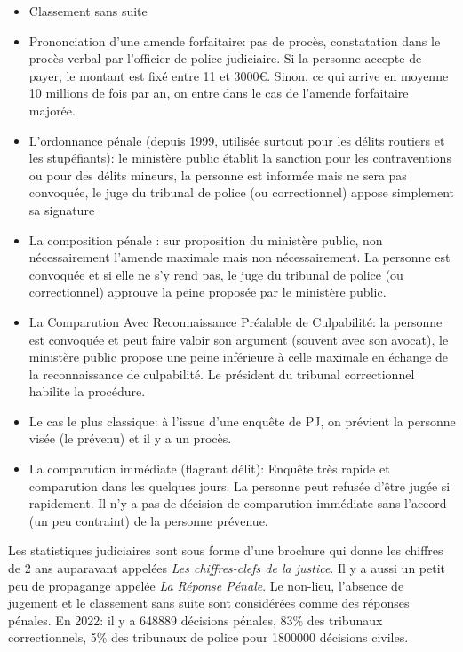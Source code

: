 \documentclass[math]{cours}
\begin{document}
\begin{itemize}
	\item Classement sans suite
	\item Prononciation d'une amende forfaitaire: pas de procès, constatation dans le procès-verbal par l'officier de police judiciaire.
	      Si la personne accepte de payer, le montant est fixé entre 11 et 3000€.
	      Sinon, ce qui arrive en moyenne 10 millions de fois par an, on entre dans le cas de l'amende forfaitaire majorée.
	\item L'ordonnance pénale (depuis 1999, utilisée surtout pour les délits routiers et les stupéfiants):
	      le ministère public établit la sanction pour les contraventions ou pour des délits mineurs,
	      la personne est informée mais ne sera pas convoquée, le juge du tribunal de police (ou correctionnel) appose simplement sa signature
	\item La composition pénale :
	      sur proposition du ministère public, non nécessairement l'amende maximale mais non nécessairement.
	      La personne est convoquée et si elle ne s'y rend pas, le juge du tribunal de police (ou correctionnel) approuve la peine proposée par le ministère public.
	\item La Comparution Avec Reconnaissance Préalable de Culpabilité:
	      la personne est convoquée et peut faire valoir son argument (souvent avec son avocat),
	      le ministère public propose une peine inférieure à celle maximale en échange de la reconnaissance de culpabilité.
	      Le président du tribunal correctionnel habilite la procédure.

	\item Le cas le plus classique:
	      à l'issue d'une enquête de PJ, on prévient la personne visée (le prévenu) et il y a un procès.
	\item La comparution immédiate (flagrant délit):
	      Enquête très rapide et comparution dans les quelques jours.
	      La personne peut refusée d'être jugée si rapidement.
	      Il n'y a pas de décision de comparution immédiate sans l'accord (un peu contraint) de la personne prévenue.
\end{itemize}
Les statistiques judiciaires sont sous forme d'une brochure qui donne les chiffres de 2 ans auparavant appelées \textit{Les chiffres-clefs de la justice}.
Il y a aussi un petit peu de propagange appelée \textit{La Réponse Pénale}.
Le non-lieu, l'absence de jugement et le classement sans suite sont considérées comme des réponses pénales.
En 2022: il y a 648889 décisions pénales, 83\% des tribunaux correctionnels, 5\% des tribunaux de police pour 1800000 décisions civiles.\\
\end{document}
